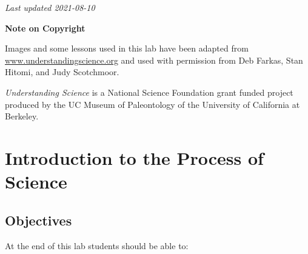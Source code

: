 \documentclass[
]{book}
\begin{document}
\emph{Last updated 2021-08-10}

\textbf{Note on Copyright}

Images and some lessons used in this lab have been adapted from \href{http://www.understandingscience.org/}{www.understandingscience.org} and used with permission from Deb Farkas, Stan Hitomi, and Judy Scotchmoor.

\emph{Understanding Science} is a National Science Foundation grant funded project produced by the UC Museum of Paleontology of the University of California at Berkeley.

\hypertarget{introduction-to-the-process-of-science}{%
\section*{Introduction to the Process of Science}\label{introduction-to-the-process-of-science}}

\hypertarget{objectives}{%
\subsection*{Objectives}\label{objectives}}

At the end of this lab students should be able to:
\end{document}
